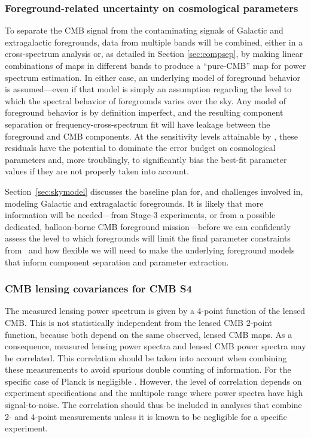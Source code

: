 \subsubsection{Foreground-related uncertainty on cosmological parameters}
\label{se:paramforeg}


To separate the CMB signal from the contaminating signals of Galactic and extragalactic foregrounds, 
data from multiple bands will be combined, either 
in a cross-spectrum analysis or, as detailed in Section \ref{sec:compsep}, by making linear 
combinations of maps in different bands to produce a ``pure-CMB'' map for power spectrum estimation.
In either case, an underlying model of foreground behavior is assumed---even if that model is simply
an assumption regarding the level to which the spectral behavior of foregrounds varies over the sky.
Any model of foreground behavior is by definition imperfect, and the resulting component separation
or frequency-cross-spectrum fit will have leakage between the foreground and CMB components.
At the sensitivity levels attainable by \cmbexp, these residuals have the potential to dominate the
error budget on cosmological parameters and, more troublingly, to significantly bias the best-fit 
parameter values if they are not properly taken into account.

Section~\ref{sec:skymodel} discusses the baseline plan for, and challenges involved in, modeling
Galactic and extragalactic foregrounds. It is likely that more information will be needed---from 
Stage-3 experiments, or from a possible dedicated, balloon-borne CMB foreground mission---before
we can confidently assess the level to which foregrounds will limit the final parameter constraints
from \cmbexp\ and how flexible we will need to make the underlying foreground models that 
inform component separation and parameter extraction. 

\subsubsection{CMB lensing covariances for CMB S4}
\label{se:covs}

The measured lensing power spectrum is given by a 4-point function of the lensed CMB.  This is not statistically independent from the lensed CMB 2-point function, because both depend on the same observed, lensed CMB maps.  As a consequence, measured lensing power spectra and lensed CMB power spectra may be correlated.  This correlation should be taken into account when combining these measurements to avoid spurious double counting of information.  For the specific case of Planck is negligible  \cite{marcel1308}.  However, the level of correlation depends on experiment specifications and the multipole range where power spectra have high signal-to-noise.  The correlation should thus be included in analyses that combine 2- and 4-point measurements unless it is known to be negligible for a specific experiment. 

